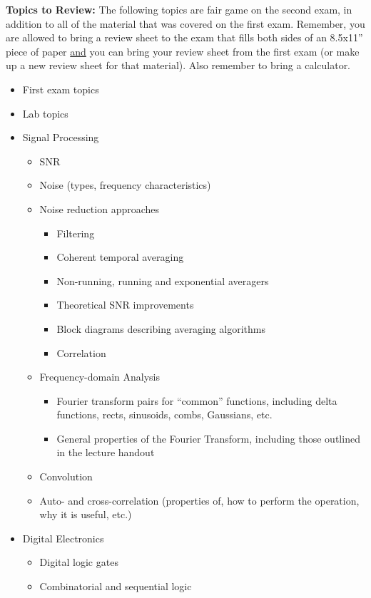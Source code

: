 \documentclass[10pt]{report}
\begin{document}
 {\bf Topics to Review:} The following topics are fair game on
the second exam, in addition to all of the material that was covered on the
first exam.  Remember, you are allowed to bring a review sheet to the exam that
fills both sides of an 8.5x11'' piece of paper \underline{and} you can bring
your review sheet from the first exam (or make up a new review sheet for that
material).  Also remember to bring a calculator.

\begin{itemize}
\item First exam topics 
\item Lab topics
\item Signal Processing
\begin{itemize}
    \item SNR
    \item Noise (types, frequency characteristics)
    \item Noise reduction approaches
    \begin{itemize}
        \item Filtering
        \item Coherent temporal averaging
        \item Non-running, running and exponential averagers
        \item Theoretical SNR improvements
        \item Block diagrams describing averaging algorithms
        \item Correlation
    \end{itemize}
    \item Frequency-domain Analysis
    \begin{itemize}
        \item Fourier transform pairs for ``common'' functions, including delta functions, rects, sinusoids, combs, Gaussians, etc.
        \item General properties of the Fourier Transform, including those outlined in the lecture handout
    \end{itemize}
    \item Convolution
    \item Auto- and cross-correlation (properties of, how to perform the operation, why it is useful, etc.)
\end{itemize}
\item Digital Electronics
\begin{itemize}
    \item Digital logic gates
    \item Combinatorial and sequential logic

\end{itemize}
\end{itemize}
\end{document}
